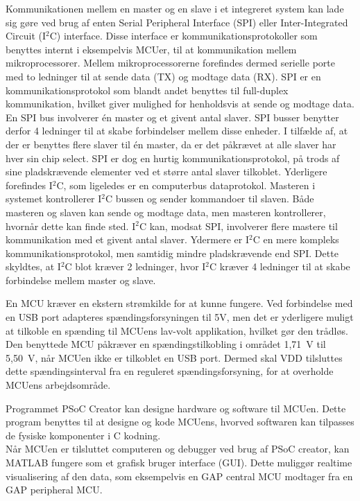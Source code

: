 Kommunikationen mellem en master og en slave i et integreret system kan lade sig gøre ved brug af enten Serial Peripheral Interface (SPI) eller Inter-Integrated Circuit (I$^{2}$C) interface. Disse interface er kommunikationsprotokoller som benyttes internt i eksempelvis MCUer, til at kommunikation mellem mikroprocessorer. Mellem mikroprocessorerne forefindes dermed serielle porte med to ledninger til at sende data (TX) og modtage data (RX). \citep{Semiconductor2016} \newline
SPI er en kommunikationsprotokol som blandt andet benyttes til full-duplex kommunikation, hvilket giver mulighed for henholdsvis at sende og modtage data. En SPI bus involverer én master og et givent antal slaver. SPI busser benytter derfor 4 ledninger til at skabe forbindelser mellem disse enheder. I tilfælde af, at der er benyttes flere slaver til én master, da er det påkrævet at alle slaver har hver sin chip select. SPI er dog en hurtig kommunikationsprotokol, på trods af sine pladskrævende elementer ved et større antal slaver tilkoblet. \citep{Semiconductor2016,Sparkfun2016} \newline
Yderligere forefindes I$^{2}$C, som ligeledes er en computerbus dataprotokol. Masteren i systemet kontrollerer I$^{2}$C bussen og sender kommandoer til slaven. Både masteren og slaven kan sende og modtage data, men masteren kontrollerer, hvornår dette kan finde sted. \newline
I$^{2}$C kan, modsat SPI, involverer flere mastere til kommunikation med et givent antal slaver. Ydermere er I$^{2}$C en mere kompleks kommunikationsprotokol, men samtidig mindre pladskrævende end SPI. Dette skyldtes, at I$^{2}$C blot kræver 2 ledninger, hvor I$^{2}$C kræver 4 ledninger til at skabe forbindelse mellem master og slave. \citep{Semiconductor2016,Sparkfun2016}

En MCU kræver en ekstern strømkilde for at kunne fungere. Ved forbindelse med en USB port adapteres spændingsforsyningen til 5V, men det er yderligere muligt at tilkoble en spænding til MCUens lav-volt applikation, hvilket gør den trådløs. \newline
Den benyttede MCU påkræver en spændingstilkobling i området 1,71~V til 5,50~V, når MCUen ikke er tilkoblet en USB port. Dermed skal VDD tilsluttes dette spændingsinterval fra en reguleret spændingsforsyning, for at overholde MCUens arbejdsområde. \citep{Semiconductor2016,Semiconductor20164200M}

Programmet PSoC Creator kan designe hardware og software til MCUen. Dette program benyttes til at designe og kode MCUens, hvorved softwaren kan tilpasses de fysiske komponenter i C kodning. \citep{Semiconductor2016} \\
Når MCUen er tilsluttet computeren og debugger ved brug af PSoC creator, kan MATLAB fungere som et grafisk bruger interface (GUI). Dette muliggør realtime visualisering af den data, som eksempelvis en GAP central MCU modtager fra en GAP peripheral MCU.\citep{Semiconductor2016,Sparkfun2016}

